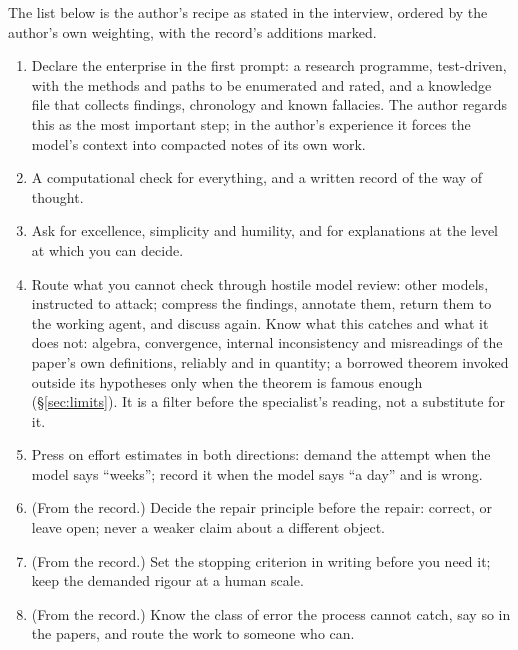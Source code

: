 \documentclass[11pt,a4paper]{article}
\begin{document}
The list below is the author's recipe as stated in the interview, ordered by the author's own weighting, with
the record's additions marked.
\begin{enumerate}[itemsep=1pt]
\item Declare the enterprise in the first prompt: a research programme, test-driven, with the methods and paths to
  be enumerated and rated, and a knowledge file that collects findings, chronology and known fallacies. The author
  regards this as the most important step; in the author's experience it forces the model's context into compacted
  notes of its own work.
\item A computational check for everything, and a written record of the way of thought.
\item Ask for excellence, simplicity and humility, and for explanations at the level at which you can decide.
\item Route what you cannot check through hostile model review: other models, instructed to attack; compress the
  findings, annotate them, return them to the working agent, and discuss again. Know what this catches and what it
  does not: algebra, convergence, internal inconsistency and misreadings of the paper's own definitions, reliably and
  in quantity; a borrowed theorem invoked outside its hypotheses only when the theorem is famous enough (\S\ref{sec:limits}).
  It is a filter before the specialist's reading, not a substitute for it.
\item Press on effort estimates in both directions: demand the attempt when the model says ``weeks''; record it when
  the model says ``a day'' and is wrong.
\item (From the record.) Decide the repair principle before the repair: correct, or leave open; never a weaker claim
  about a different object.
\item (From the record.) Set the stopping criterion in writing before you need it; keep the demanded rigour at a
  human scale.
\item (From the record.) Know the class of error the process cannot catch, say so in the papers, and route the work
  to someone who can.
\end{enumerate}
\end{document}
